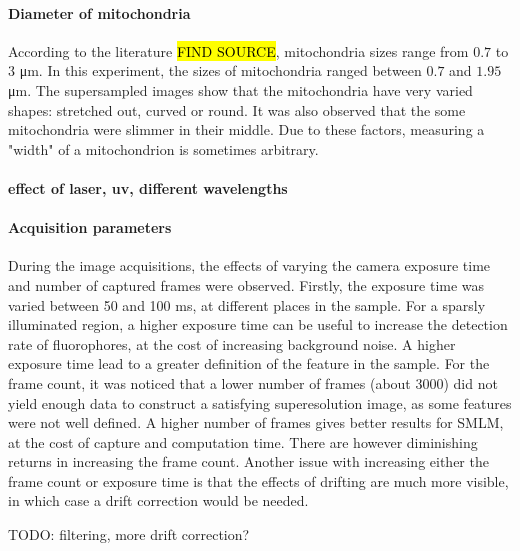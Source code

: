 \paragraph{Diameter of mitochondria}
According to the literature \hl{FIND SOURCE}, mitochondria sizes range from $0.7$ to $3$ \si{\micro\meter}. In this experiment, the sizes of mitochondria ranged between $0.7$ and $1.95$ \si{\micro\meter}. The supersampled images show that the mitochondria have very varied shapes: stretched out, curved or round. It was also observed that the some mitochondria were slimmer in their middle. Due to these factors, measuring a "width" of a mitochondrion is sometimes arbitrary.

\paragraph{effect of laser, uv, different wavelengths}

\paragraph{Acquisition parameters}
During the image acquisitions, the effects of varying the camera exposure time and number of captured frames were observed. Firstly, the exposure time was varied between 50 and 100 ms, at different places in the sample. For a sparsly illuminated region, a higher exposure time can be useful to increase the detection rate of fluorophores, at the cost of increasing background noise. A higher exposure time lead to a greater definition of the feature in the sample. For the frame count, it was noticed that a lower number of frames (about 3000) did not yield enough data to construct a satisfying superesolution image, as some features were not well defined. A higher number of frames gives better results for SMLM, at the cost of capture and computation time. There are however diminishing returns in increasing the frame count. Another issue with increasing either the frame count or exposure time is that the effects of drifting are much more visible, in which case a drift correction would be needed.

TODO: filtering, more drift correction?